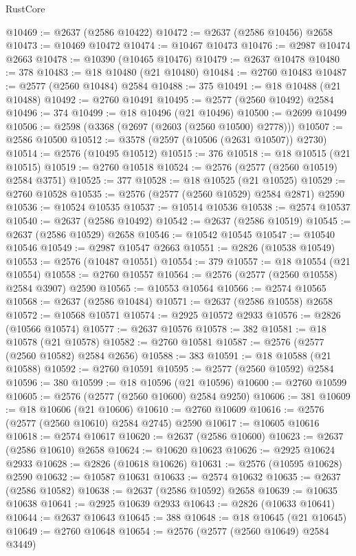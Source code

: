 \begin{lexlean}{RustCore}
\begin{coremodule}
@10469 := @2637 (@2586 @10422)
@10472 := @2637 (@2586 @10456) @2658
@10473 := @10469 @10472
@10474 := @10467 @10473
@10476 := @2987 @10474 @2663
@10478 := @10390 (@10465 @10476)
@10479 := @2637 @10478
@10480 := 378
@10483 := @18 @10480 (@21 @10480)
@10484 := @2760 @10483
@10487 := @2577 (@2560 @10484) @2584
@10488 := 375
@10491 := @18 @10488 (@21 @10488)
@10492 := @2760 @10491
@10495 := @2577 (@2560 @10492) @2584
@10496 := 374
@10499 := @18 @10496 (@21 @10496)
@10500 := @2699 @10499
@10506 := @2598 (@3368 (@2697 (@2603 (@2560 @10500) @2778)))
@10507 := @2586 @10500
@10512 := @3578 (@2597 (@10506 (@2631 @10507)) @2730)
@10514 := @2576 (@10495 @10512)
@10515 := 376
@10518 := @18 @10515 (@21 @10515)
@10519 := @2760 @10518
@10524 := @2576 (@2577 (@2560 @10519) @2584 @3751)
@10525 := 377
@10528 := @18 @10525 (@21 @10525)
@10529 := @2760 @10528
@10535 := @2576 (@2577 (@2560 @10529) @2584 @2871) @2590
@10536 := @10524 @10535
@10537 := @10514 @10536
@10538 := @2574 @10537
@10540 := @2637 (@2586 @10492)
@10542 := @2637 (@2586 @10519)
@10545 := @2637 (@2586 @10529) @2658
@10546 := @10542 @10545
@10547 := @10540 @10546
@10549 := @2987 @10547 @2663
@10551 := @2826 (@10538 @10549)
@10553 := @2576 (@10487 @10551)
@10554 := 379
@10557 := @18 @10554 (@21 @10554)
@10558 := @2760 @10557
@10564 := @2576 (@2577 (@2560 @10558) @2584 @3907) @2590
@10565 := @10553 @10564
@10566 := @2574 @10565
@10568 := @2637 (@2586 @10484)
@10571 := @2637 (@2586 @10558) @2658
@10572 := @10568 @10571
@10574 := @2925 @10572 @2933
@10576 := @2826 (@10566 @10574)
@10577 := @2637 @10576
@10578 := 382
@10581 := @18 @10578 (@21 @10578)
@10582 := @2760 @10581
@10587 := @2576 (@2577 (@2560 @10582) @2584 @2656)
@10588 := 383
@10591 := @18 @10588 (@21 @10588)
@10592 := @2760 @10591
@10595 := @2577 (@2560 @10592) @2584
@10596 := 380
@10599 := @18 @10596 (@21 @10596)
@10600 := @2760 @10599
@10605 := @2576 (@2577 (@2560 @10600) @2584 @9250)
@10606 := 381
@10609 := @18 @10606 (@21 @10606)
@10610 := @2760 @10609
@10616 := @2576 (@2577 (@2560 @10610) @2584 @2745) @2590
@10617 := @10605 @10616
@10618 := @2574 @10617
@10620 := @2637 (@2586 @10600)
@10623 := @2637 (@2586 @10610) @2658
@10624 := @10620 @10623
@10626 := @2925 @10624 @2933
@10628 := @2826 (@10618 @10626)
@10631 := @2576 (@10595 @10628) @2590
@10632 := @10587 @10631
@10633 := @2574 @10632
@10635 := @2637 (@2586 @10582)
@10638 := @2637 (@2586 @10592) @2658
@10639 := @10635 @10638
@10641 := @2925 @10639 @2933
@10643 := @2826 (@10633 @10641)
@10644 := @2637 @10643
@10645 := 388
@10648 := @18 @10645 (@21 @10645)
@10649 := @2760 @10648
@10654 := @2576 (@2577 (@2560 @10649) @2584 @3449)

\end{coremodule}
\end{lexlean}

